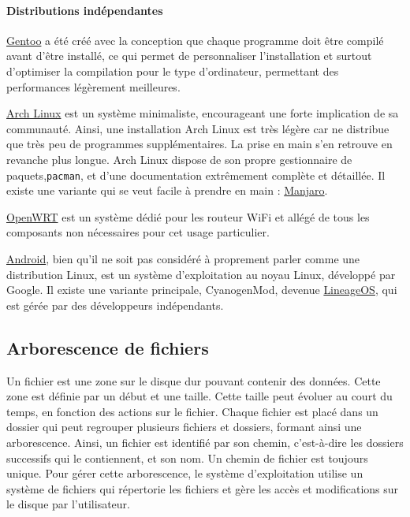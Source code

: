 \paragraph{Distributions indépendantes}

\href{https://www.gentoo.org}{Gentoo} a été créé avec la conception que chaque programme doit être compilé avant d'être installé, ce qui permet de personnaliser l'installation et surtout d'optimiser la compilation pour le type d'ordinateur, permettant des performances légèrement meilleures.

\href{https://www.archlinux.org}{Arch Linux} est un système minimaliste, encourageant une forte implication de sa communauté. Ainsi, une installation Arch Linux est très légère car ne distribue que très peu de programmes supplémentaires. La prise en main s'en retrouve en revanche plus longue. Arch Linux dispose de son propre gestionnaire de paquets,\texttt{pacman}, et d'une documentation extrêmement complète et détaillée. Il existe une variante qui se veut facile à prendre en main : \href{https://manjaro.org}{Manjaro}.

\href{https://openwrt.org}{OpenWRT} est un système dédié pour les routeur WiFi et allégé de tous les composants non nécessaires pour cet usage particulier.

\href{https://www.android.com}{Android}, bien qu'il ne soit pas considéré à proprement parler comme une distribution Linux, est un système d'exploitation au noyau Linux, développé par Google. Il existe une variante principale, CyanogenMod, devenue \href{https://lineageos.org}{LineageOS}, qui est gérée par des développeurs indépendants.

\newpage

\subsection{Arborescence de fichiers} \label{sec:directories}
Un fichier est une zone sur le disque dur pouvant contenir des données. Cette zone est définie par un début et une taille. Cette taille peut évoluer au court du temps, en fonction des actions sur le fichier. Chaque fichier est placé dans un dossier qui peut regrouper plusieurs fichiers et dossiers, formant ainsi une arborescence. Ainsi, un fichier est identifié par son chemin, c'est-à-dire les dossiers successifs qui le contiennent, et son nom. Un chemin de fichier est toujours unique. Pour gérer cette arborescence, le système d'exploitation utilise un système de fichiers qui répertorie les fichiers et gère les accès et modifications sur le disque par l'utilisateur.

